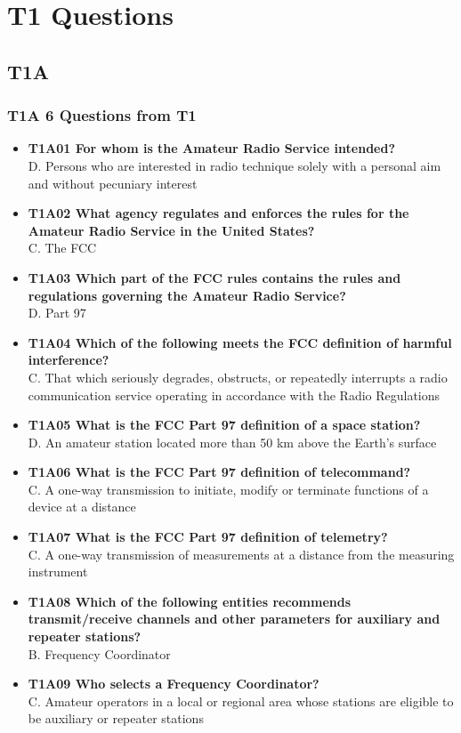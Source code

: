 \documentclass[10pt]{beamer}
\begin{document}
\section{T1 Questions}
\subsection{T1A}
\begin{frame}
\frametitle{T1A 6 Questions from T1}
\begin{itemize}[<+->]
\tiny
\item\textbf{T1A01 For whom is the Amateur Radio Service intended?}\hfil \\D. Persons who are interested in radio technique solely with a personal aim and without pecuniary interest
\item\textbf{T1A02 What agency regulates and enforces the rules for the Amateur Radio Service in the United States?} \hfil \\ C. The FCC
\item\textbf{T1A03 Which part of the FCC rules contains the rules and regulations governing the Amateur Radio Service?}\hfil \\ D. Part 97
\item\textbf{T1A04 Which of the following meets the FCC definition of harmful interference?} \hfil \\ C. That which seriously degrades, obstructs, or repeatedly interrupts a radio communication service operating in accordance with the Radio Regulations
\item\textbf{T1A05 What is the FCC Part 97 definition of a space station?} \hfil \\  D. An amateur station located more than 50 km above the Earth’s surface
\item\textbf{T1A06 What is the FCC Part 97 definition of telecommand?}\hfil \\  C. A one-way transmission to initiate, modify or terminate functions of a device at a distance
\item\textbf{T1A07 What is the FCC Part 97 definition of telemetry?}\hfil \\ C. A one-way transmission of measurements at a distance from the measuring instrument
\item\textbf{T1A08 Which of the following entities recommends transmit/receive channels and other parameters for auxiliary and repeater stations?}\hfil \\B. Frequency Coordinator
\item\textbf{T1A09 Who selects a Frequency Coordinator?}\hfil \\ C. Amateur operators in a local or regional area whose stations are eligible to be auxiliary or repeater stations

\end{itemize}
\end{frame}
\end{document}

